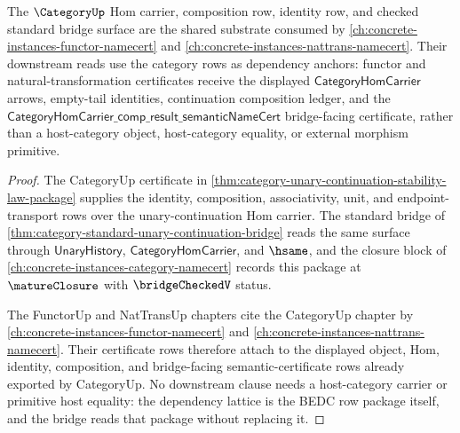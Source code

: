 \begin{proposition}
\label{prop:category-standard-bridge-dependency-lattice}
The $\CategoryUp$ Hom carrier, composition row, identity row, and checked
standard bridge surface are the shared substrate consumed by
\autoref{ch:concrete-instances-functor-namecert} and
\autoref{ch:concrete-instances-nattrans-namecert}. Their downstream reads use
the category rows as dependency anchors: functor and natural-transformation
certificates receive the displayed $\mathsf{CategoryHomCarrier}$ arrows,
empty-tail identities, continuation composition ledger, and the
$\mathsf{CategoryHomCarrier\_comp\_result\_semanticNameCert}$ bridge-facing
certificate, rather than a host-category object, host-category equality, or
external morphism primitive.
\end{proposition}
\begin{proof}
The CategoryUp certificate in
\autoref{thm:category-unary-continuation-stability-law-package} supplies the
identity, composition, associativity, unit, and endpoint-transport rows over
the unary-continuation Hom carrier. The standard bridge of
\autoref{thm:category-standard-unary-continuation-bridge} reads the same
surface through $\mathsf{UnaryHistory}$, $\mathsf{CategoryHomCarrier}$, and
$\hsame$, and the closure block of
\autoref{ch:concrete-instances-category-namecert} records this package at
$\matureClosure$ with $\bridgeCheckedV$ status.

The FunctorUp and NatTransUp chapters cite the CategoryUp chapter by
\autoref{ch:concrete-instances-functor-namecert} and
\autoref{ch:concrete-instances-nattrans-namecert}. Their certificate rows
therefore attach to the displayed object, Hom, identity, composition, and
bridge-facing semantic-certificate rows already exported by CategoryUp. No
downstream clause needs a host-category carrier or primitive host equality:
the dependency lattice is the BEDC row package itself, and the bridge reads
that package without replacing it.
\end{proof}
